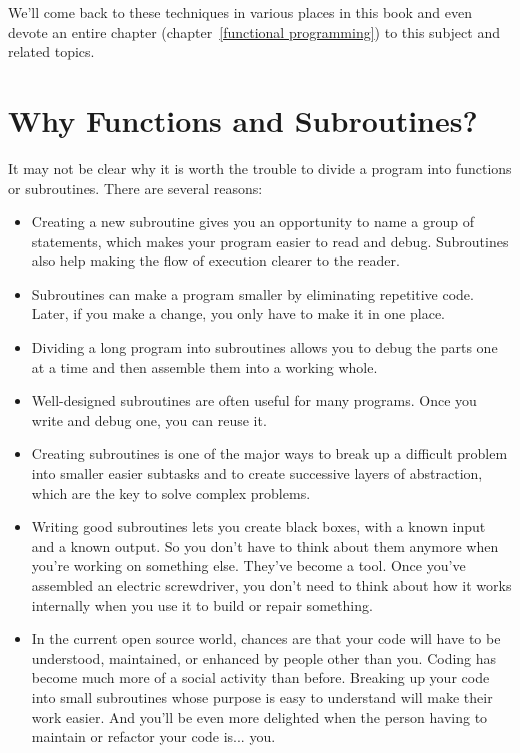 We'll come back to these techniques in various places in this 
book and even devote an entire chapter (chapter~\ref{functional 
programming}) to this subject and related topics.


\section{Why Functions and Subroutines?}

It may not be clear why it is worth the trouble to divide
a program into functions or subroutines.  There are 
several reasons:

\begin{itemize}

\item Creating a new subroutine gives you an opportunity to 
name a group of statements, which makes your program easier 
to read and debug. Subroutines also help making the flow of 
execution clearer to the reader.

\item Subroutines can make a program smaller by eliminating 
repetitive code.  Later, if you make a change, you only have
to make it in one place.

\item Dividing a long program into subroutines allows you 
to debug the parts one at a time and then assemble them 
into a working whole.

\item Well-designed subroutines are often useful for many programs.
Once you write and debug one, you can reuse it.

\item Creating subroutines is one of the major ways to 
break up a difficult problem into smaller easier subtasks 
and to create successive layers of abstraction, which are 
the key to solve complex problems.

\item Writing good subroutines lets you create black boxes, with 
a known input and a known output. So you don't have to think 
about them anymore when you're working on something else.  
They've become a tool.  Once you've assembled an electric 
screwdriver, you don't need to think about how it works internally 
when you use it to build or repair something.

\item In the current open source world, chances are that your 
code will have to be understood, maintained, or enhanced by 
people other than you. Coding has become much more of a social 
activity than before. Breaking up your code into small subroutines 
whose purpose is easy to understand will make their work easier. 
And you'll be even more delighted when the person 
having to maintain or refactor your code is... you.

\end{itemize}



